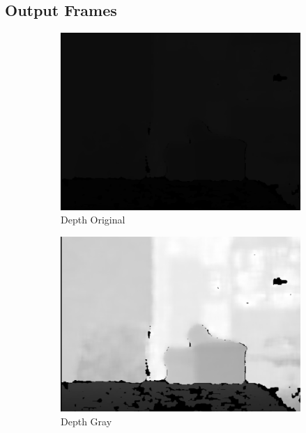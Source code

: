 \documentclass[a4paper,11pt]{article}
\begin{document}
	\subsection{Output Frames}
	\begin{figure}[H]
		\centering
		\begin{subfigure}{0.32\textwidth}
			\centering
			\includegraphics[width=\linewidth]{Images/depth_original.png}
			\caption{Depth Original}
		\end{subfigure}\hfill
		\begin{subfigure}{0.32\textwidth}
			\centering
			\includegraphics[width=\linewidth]{Images/depth_gray.png}
			\caption{Depth Gray}
		\end{subfigure}\hfill
			\begin{subfigure}{0.32\textwidth}

\end{subfigure}
\end{figure}
\end{document}
